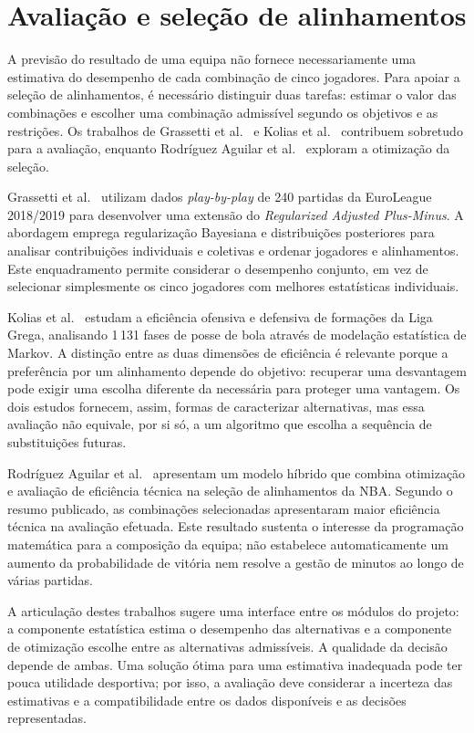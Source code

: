 \section{Avaliação e seleção de alinhamentos}
\label{sec:avaliacao-alinhamentos}

A previsão do resultado de uma equipa não fornece necessariamente uma
estimativa do desempenho de cada combinação de cinco jogadores.
Para apoiar a seleção de alinhamentos, é necessário distinguir duas
tarefas: estimar o valor das combinações e escolher uma combinação
admissível segundo os objetivos e as restrições. Os trabalhos de
Grassetti et al.~\cite{grassetti2021} e Kolias et al.~\cite{kolias2022}
contribuem sobretudo para a avaliação, enquanto Rodríguez Aguilar et
al.~\cite{rodriguez2020} exploram a otimização da seleção.

Grassetti et al.~\cite{grassetti2021} utilizam dados \emph{play-by-play}
de 240 partidas da EuroLeague 2018/2019 para desenvolver uma extensão
do \emph{Regularized Adjusted Plus-Minus}. A abordagem emprega
regularização Bayesiana e distribuições posteriores para analisar
contribuições individuais e coletivas e ordenar jogadores e
alinhamentos. Este enquadramento permite considerar o desempenho
conjunto, em vez de selecionar simplesmente os cinco jogadores com
melhores estatísticas individuais.

Kolias et al.~\cite{kolias2022} estudam a eficiência ofensiva e defensiva
de formações da Liga Grega, analisando 1\,131 fases de posse de bola
através de modelação estatística de Markov. A distinção entre as duas
dimensões de eficiência é relevante porque a preferência por um
alinhamento depende do objetivo: recuperar uma desvantagem pode exigir
uma escolha diferente da necessária para proteger uma vantagem.
Os dois estudos fornecem, assim, formas de caracterizar alternativas,
mas essa avaliação não equivale, por si só, a um algoritmo que escolha
a sequência de substituições futuras.

Rodríguez Aguilar et al.~\cite{rodriguez2020} apresentam um modelo
híbrido que combina otimização e avaliação de eficiência técnica na
seleção de alinhamentos da NBA. Segundo o resumo publicado, as
combinações selecionadas apresentaram maior eficiência técnica na
avaliação efetuada. Este resultado sustenta o interesse da programação
matemática para a composição da equipa; não estabelece automaticamente
um aumento da probabilidade de vitória nem resolve a gestão de minutos
ao longo de várias partidas.

A articulação destes trabalhos sugere uma interface entre os módulos
do projeto: a componente estatística estima o desempenho das alternativas
e a componente de otimização escolhe entre as alternativas admissíveis.
A qualidade da decisão depende de ambas. Uma solução ótima para uma
estimativa inadequada pode ter pouca utilidade desportiva; por isso,
a avaliação deve considerar a incerteza das estimativas e a
compatibilidade entre os dados disponíveis e as decisões representadas.

